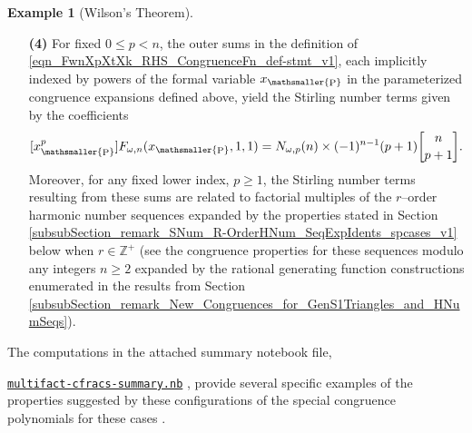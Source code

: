 \documentclass[12pt,reqno]{article}
\numberwithin{sfootnote}{section}
\numberwithin{equation}{section}
\theoremstyle{plain}
\theoremstyle{definition}
\newtheorem{example}[theorem]{Example}
\theoremstyle{remark}
\newcommand{\cf}[0]{cf.\ }
\newcommand{\TheSummaryNBFile}[0]{\texttt{multifact-cfracs-summary.nb}}
\newcommand{\TheSummaryNBFileGoogleDriveLink}[0]{https://drive.google.com/file/d/0B6na6iIT7ICZRFltbTVVcmVpVk0/view?usp=drivesdk}
\renewcommand{\TheSummaryNBFile}{ 
     \href{\TheSummaryNBFileGoogleDriveLink}{\texttt{multifact-cfracs-summary.nb}}%
}
\newcommand{\gkpSI}[2]{\ensuremath{\genfrac{\lbrack}{\rbrack}{0pt}{}{#1}{#2}}}
\DeclareMathOperator{\XP}{P}
\newcommand{\xp}{x_{\mathsmaller{\XP}}}
\begin{document}
\begin{example}[Wilson's Theorem]
\begin{itemize}
     \item[\bf (4)] 
     For fixed $0 \leq p < n$, the outer sums in the 
     definition of \eqref{eqn_FwnXpXtXk_RHS_CongruenceFn_def-stmt_v1}, 
     each implicitly indexed by powers of the 
     formal variable $\xp$ in the 
     parameterized congruence expansions defined above, 
     yield the Stirling number terms given by the coefficients 
     \[ 
     [\xp^{p}] F_{\omega,n}(\xp, 1, 1) = 
      N_{\omega,p}(n) \times (-1)^{n-1} (p+1) \gkpSI{n}{p+1}. 
     \] 
     Moreover, for any fixed lower index, $p \geq 1$, the 
     Stirling number terms resulting from these sums are 
     related to factorial multiples of the $r$--order harmonic number 
     sequences expanded by the properties stated in 
     Section \ref{subsubSection_remark_SNum_R-OrderHNum_SeqExpIdents_spcases_v1} below 
     when $r \in \mathbb{Z}^{+}$ \citep[\cf \S 4.3]{MULTIFACTJIS} 
     (see the congruence properties for these sequences 
     modulo any integers $n \geq 2$ expanded by the 
     rational generating function constructions enumerated in the results from 
     Section \ref{subsubSection_remark_New_Congruences_for_GenS1Triangles_and_HNumSeqs}). 
     \end{itemize} 
     The computations in the attached summary notebook file, 
     \TheSummaryNBFile, 
     provide several specific examples of the properties 
     suggested by these configurations of the 
     special congruence polynomials for these cases 
     \citep{SUMMARYNBREF-STUB}. 
\end{example} 
\end{document}
